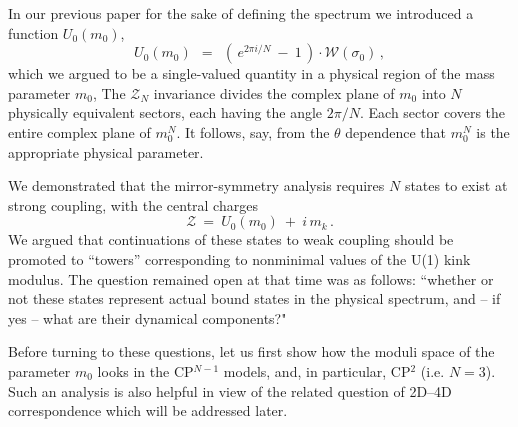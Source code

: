 \documentclass[epsfig,12pt]{article}
\def\beq{\begin{equation}}
\def\eeq{\end{equation}}
\def\beq{\begin{equation}}
\def\eeq{\end{equation}}
\newcommand{\mc}[1]{\mathcal{#1}}
\begin{document}
	In our previous paper \cite{Bolokhov:2011mp} for the sake of defining the spectrum we introduced a function $ U_0(m_0) $,
\beq
	U_0 (m_0) ~~=~~ \left(\, e^{2 \pi i / N} ~-~ 1 \,\right) \cdot \mc{W}(\sigma_0)\,,
\eeq
	which we argued to be a single-valued quantity in a physical region of the mass parameter $ m_0 $,
	The $\mc{Z}_N$ invariance divides the complex plane of $ m_0 $ into $ N $ physically equivalent  sectors,
	each having the angle $2\pi/N$. Each sector covers the entire complex plane of
	$m_0^N$. It follows, say, from the $\theta$ dependence that $m_0^N$ is the appropriate physical parameter.
	
	We demonstrated that the mirror-symmetry analysis requires $ N $ states to exist at strong coupling,
	with  the 
	central charges
\beq
\label{Usp}
	\mc{Z} ~=~ U_0(m_0) ~+~ i\,m_k\,.
\eeq
	We argued that continuations of these states to  weak coupling should be promoted to ``towers''
	corresponding to nonminimal values of the U(1) kink modulus.
	The question remained open at that time was as follows: ``whether or not these states represent
	actual bound states in the physical spectrum, and -- if yes -- what are their dynamical components?"

	Before turning to these questions,  let us first show how the moduli space of the parameter
	$ m_0 $ looks   in the CP$^{N-1}$ models, and, in particular, CP$^2$ (i.e. $N=3$). 
	Such an analysis is also helpful in view of the related question of 2D--4D correspondence
	which will be addressed later.
	
\end{document}

